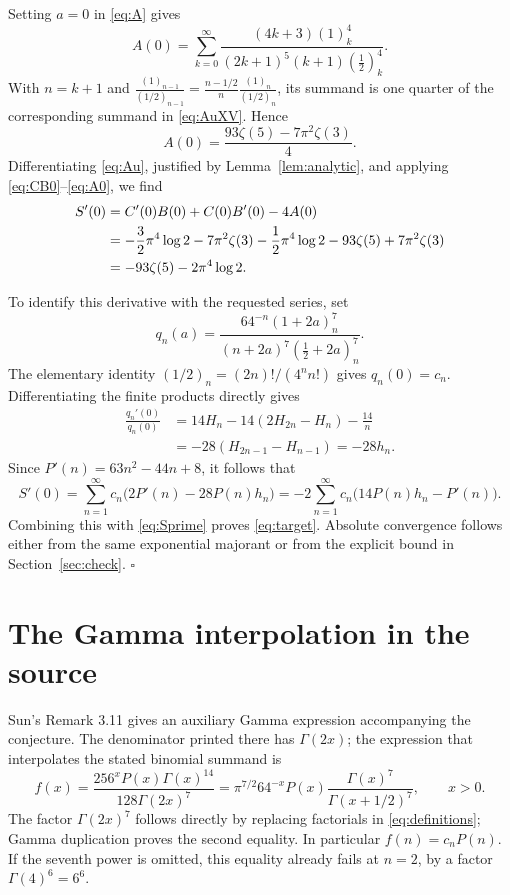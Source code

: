 \documentclass[11pt]{article}
\begin{document}
Setting $a=0$ in \eqref{eq:A} gives
\[
 A(0)=\sum_{k=0}^{\infty}
 \frac{(4k+3)(1)_k^4}{(2k+1)^5(k+1)(\tfrac12)_k^4}.
\]
With $n=k+1$ and
$\frac{(1)_{n-1}}{(1/2)_{n-1}}
=\frac{n-1/2}{n}\frac{(1)_n}{(1/2)_n}$, its summand is one quarter
of the corresponding summand in \eqref{eq:AuXV}. Hence
\begin{equation}\label{eq:A0}
 A(0)=\frac{93\zeta(5)-7\pi^2\zeta(3)}4.
\end{equation}
Differentiating \eqref{eq:Au}, justified by Lemma~\ref{lem:analytic},
and applying \eqref{eq:CB0}--\eqref{eq:A0}, we find
\begin{align}
 S'(0)&=C'(0)B(0)+C(0)B'(0)-4A(0)\notag\\
 &=-\frac32\pi^4\log2-7\pi^2\zeta(3)
 -\frac12\pi^4\log2-93\zeta(5)+7\pi^2\zeta(3)\notag\\
 &=-93\zeta(5)-2\pi^4\log2.\label{eq:Sprime}
\end{align}

To identify this derivative with the requested series, set
\[
 q_n(a)=\frac{64^{-n}(1+2a)_n^7}
 {(n+2a)^7(\tfrac12+2a)_n^7}.
\]
The elementary identity $(1/2)_n=(2n)!/(4^nn!)$ gives $q_n(0)=c_n$.
Differentiating the finite products directly gives
\begin{align*}
 \frac{q_n'(0)}{q_n(0)}
 &=14H_n-14(2H_{2n}-H_n)-\frac{14}{n}\\
 &=-28(H_{2n-1}-H_{n-1})=-28h_n.
\end{align*}
Since $P'(n)=63n^2-44n+8$, it follows that
\[
 S'(0)=\sum_{n=1}^{\infty}c_n\bigl(2P'(n)-28P(n)h_n\bigr)
 =-2\sum_{n=1}^{\infty}c_n\bigl(14P(n)h_n-P'(n)\bigr).
\]
Combining this with \eqref{eq:Sprime} proves \eqref{eq:target}.
Absolute convergence follows either from the same exponential
majorant or from the explicit bound in Section~\ref{sec:check}.
\hfill$\square$

\section{The Gamma interpolation in the source}
Sun's Remark 3.11 gives an auxiliary Gamma expression accompanying
the conjecture. The denominator printed there has $\Gamma(2x)$;
the expression that interpolates the stated binomial summand is
\begin{equation}\label{eq:corrected}
 f(x)=\frac{256^x P(x)\Gamma(x)^{14}}{128\Gamma(2x)^7}
 =\pi^{7/2}64^{-x}P(x)\frac{\Gamma(x)^7}{\Gamma(x+1/2)^7},
 \qquad x>0.
\end{equation}
The factor $\Gamma(2x)^7$ follows directly by replacing factorials
in \eqref{eq:definitions}; Gamma duplication proves the second equality.
In particular $f(n)=c_nP(n)$. If the seventh power is omitted,
this equality already fails at $n=2$, by a factor $\Gamma(4)^6=6^6$.
\end{document}
